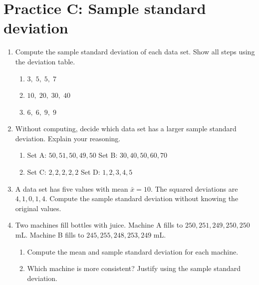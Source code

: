\section*{Practice C: Sample standard deviation}
\begin{enumerate}[label=C\arabic*.,leftmargin=2.5em,itemsep=10pt]
  \item Compute the sample standard deviation of each data set.
    Show all steps using the deviation table.
    \begin{enumerate}[label=(\alph*), itemsep=6pt]
      \item $3,\; 5,\; 5,\; 7$
      \item $10,\; 20,\; 30,\; 40$
      \item $6,\; 6,\; 9,\; 9$
    \end{enumerate}

  \item Without computing, decide which data set has a
    larger sample standard deviation. Explain your reasoning.
    \begin{enumerate}[label=(\alph*), itemsep=4pt]
      \item Set A: $50, 51, 50, 49, 50$ \quad
        Set B: $30, 40, 50, 60, 70$
      \item Set C: $2, 2, 2, 2, 2$ \quad
        Set D: $1, 2, 3, 4, 5$
    \end{enumerate}

  \item A data set has five values with mean $\bar{x} = 10$.
    The squared deviations are $4, 1, 0, 1, 4$.
    Compute the sample standard deviation without knowing the
    original values.

  \item Two machines fill bottles with juice.
    Machine A fills to $250, 251, 249, 250, 250$ mL.
    Machine B fills to $245, 255, 248, 253, 249$ mL.
    \begin{enumerate}[label=(\alph*), itemsep=4pt]
      \item Compute the mean and sample standard deviation for
        each machine.
      \item Which machine is more consistent?
        Justify using the sample standard deviation.
    \end{enumerate}

\end{enumerate}

